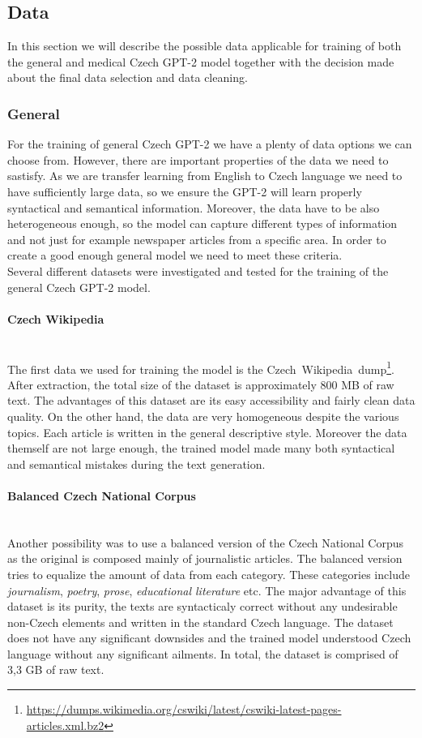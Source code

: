 \subsection{Data}
\label{sec:gptData}
In this section we will describe the possible data applicable for training of both the general and medical Czech GPT-2 model together with the decision made about the final data selection and data cleaning.

\subsubsection{General}
For the training of general Czech GPT-2 we have a plenty of data options we can choose from. However, there are important properties of the data we need to sastisfy. As we are transfer learning from English to Czech language we need to have sufficiently large data, so we ensure the GPT-2 will learn properly syntactical and semantical information. Moreover, the data have to be also heterogeneous enough, so the model can capture different types of information and not just for example newspaper articles from a specific area. In order to create a good enough general model we need to meet these criteria.\\

Several different datasets were investigated and tested for the training of the general Czech GPT-2 model.
\paragraph*{Czech Wikipedia} ~\\
\indent The first data we used for training the model is the Czech~Wikipedia~dump\footnote[2]{\url{https://dumps.wikimedia.org/cswiki/latest/cswiki-latest-pages-articles.xml.bz2}}. After extraction, the total size of the dataset is approximately 800 MB of raw text. The advantages of this dataset are its easy accessibility and fairly clean data quality. On the other hand, the data are very homogeneous despite the various topics. Each article is written in the general descriptive style. Moreover the data themself are not large enough, the trained model made many both syntactical and semantical mistakes during the text generation.

\paragraph*{Balanced Czech National Corpus} ~\\
\indent Another possibility was to use a balanced version of the Czech National Corpus\citep{11234/1-4635} as the original is composed mainly of journalistic articles. The balanced version tries to equalize the amount of data from each category. These categories include \textit{journalism}, \textit{poetry}, \textit{prose}, \textit{educational literature} etc. The major advantage of this dataset is its purity, the texts are syntacticaly correct without any undesirable non-Czech elements and written in the standard Czech language. The dataset does not have any significant downsides and the trained model understood Czech language without any significant ailments. In total, the dataset is comprised of 3,3 GB of raw text.

